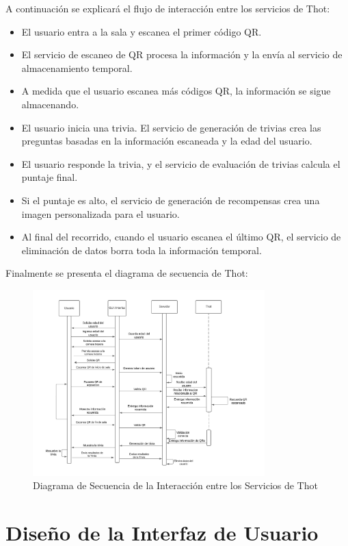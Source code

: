\documentclass{report}
\begin{document}
A continuación se explicará el flujo de interacción entre los servicios de Thot:
\begin{itemize}
    \item El usuario entra a la sala y escanea el primer código QR.
    \item El servicio de escaneo de QR procesa la información y la envía al servicio de almacenamiento temporal.
    \item A medida que el usuario escanea más códigos QR, la información se sigue almacenando.
    \item El usuario inicia una trivia. El servicio de generación de trivias crea las preguntas basadas en la información escaneada y la edad del usuario.
    \item El usuario responde la trivia, y el servicio de evaluación de trivias calcula el puntaje final.
    \item Si el puntaje es alto, el servicio de generación de recompensas crea una imagen personalizada para el usuario.
    \item Al final del recorrido, cuando el usuario escanea el último QR, el servicio de eliminación de datos borra toda la información temporal.
\end{itemize}

Finalmente se presenta el diagrama de secuencia de Thot:
\begin{figure}[H]
    \centering
    \includegraphics[width=0.8\textwidth]{DiagramaSecuenciaExp.png}
    \caption{Diagrama de Secuencia de la Interacción entre los Servicios de Thot}
\end{figure}
\section{Diseño de la Interfaz de Usuario}
\end{document}
